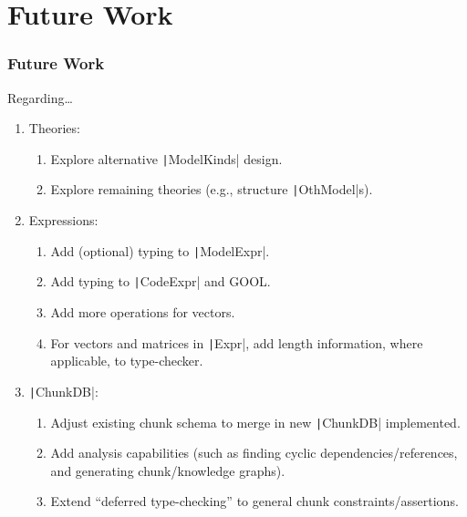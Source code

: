 \documentclass[xcolor={dvipsnames}]{beamer}
\newcommand{\inlineHs}[1]{\texttt|#1|}
\begin{document}
\section{Future Work}

\begin{frame}
  \frametitle{Future Work}

  Regarding\ldots{}
  \begin{enumerate}
    \item Theories:
      \begin{enumerate}
        \item Explore alternative \inlineHs{ModelKinds} design.
        \item Explore remaining theories (e.g., structure \inlineHs{OthModel}s).
      \end{enumerate}
    \item Expressions:
      \begin{enumerate}
        \item Add (optional) typing to \inlineHs{ModelExpr}.
        \item Add typing to \inlineHs{CodeExpr} and GOOL.
        \item Add more operations for vectors.
        \item For vectors and matrices in \inlineHs{Expr}, add length
              information, where applicable, to type-checker.
      \end{enumerate}
    \item \inlineHs{ChunkDB}:
      \begin{enumerate}
        \item Adjust existing chunk schema to merge in new \inlineHs{ChunkDB}
              implemented.
        \item Add analysis capabilities (such as finding cyclic
              dependencies/references, and generating chunk/knowledge graphs).
        \item Extend ``deferred type-checking'' to general chunk
              constraints/assertions.
      \end{enumerate}
  \end{enumerate}

\end{frame}

\end{document}
